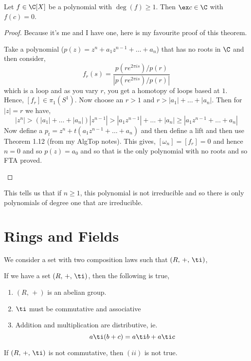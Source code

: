 \begin{nthm}
  Let $f \in \C[X]$ be a polynomial with $\deg(f) \ge 1$. Then $\ex c \in \C$ with $f(c) = 0$.
\end{nthm}
\begin{proof}
  Because it's me and I have one, here is my favourite proof of this theorem.
  \begin{tcolorbox}
    Take a polynomial ($p(z) = z^n + a_1z^{n-1} + \dots + a_n$) that has no roots in $\C$ and then consider,
    $$ f_r(s) = \frac{p(re^{2\pi is})/p(r)}{|p(re^{2\pi is})/p(r)|} $$
    which is a loop and as you vary $r$, you get a homotopy of loops based at $1$. Hence, $[f_r] \in \pi_1({S^1})$. Now choose an $r > 1$ and $r > |a_1| + \dots + |a_n|$. Then for $|z| = r$ we have,
    $$ |z^n| > (|a_1| + \dots + |a_n|)|z^{n-1}| > |a_1z^{n-1}| + \dots + |a_n| \ge |a_1z^{n-1} + \dots + a_n| $$
    Now define a $p_t = z^n + t(a_1z^{n-1} + \dots + a_n)$ and then define a lift and then use Theorem 1.12 (from my AlgTop notes). This gives, $[\omega_n] = [f_r] = 0$ and hence $n = 0$ and so $p(z) = a_0$ and so that is the only polynomial with no roots and so FTA proved.
  \end{tcolorbox}
\end{proof}

This tells us that if $n \ge 1$, this polynomial is not irreducible and so there is only polynomials of degree one that are irreducible.

\section{Rings and Fields}
We consider a set with two composition laws such that $(R,\,+,\,\ti)$,
\begin{ndefi}
  If we have a set $(R,\,+,\,\ti)$, then the following is true,
  \begin{enumerate}
    \item $(R,\,+)$ is an abelian group.
    \item $\ti$ must be commutative and associative
    \item Addition and multiplication are distributive, ie.
    $$ a \ti (b + c) = a \ti b + a \ti c $$
  \end{enumerate}
\end{ndefi}

\begin{remark}
   If $(R,\,+,\,\ti)$ is not commutative, then $(ii)$ is not true.
\end{remark}


